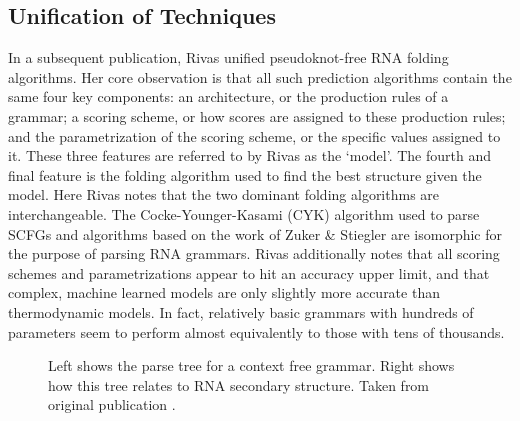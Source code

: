 \documentclass[12pt, a4paper]{article}
\begin{document}
\subsection{Unification of Techniques}

In a subsequent publication, Rivas \cite{rivas2013four} unified pseudoknot-free RNA folding algorithms. Her core observation is that all such prediction algorithms contain the same four key components: an architecture, or the production rules of a grammar; a scoring scheme, or how scores are assigned to these production rules; and the parametrization of the scoring scheme, or the specific values assigned to it. These three features are referred to by Rivas as the `model'. The fourth and final feature is the folding algorithm used to find the best structure given the model. Here Rivas notes that the two dominant folding algorithms are interchangeable. The Cocke-Younger-Kasami (CYK) algorithm used to parse SCFGs and algorithms based on the work of Zuker \& Stiegler are isomorphic for the purpose of parsing RNA grammars. Rivas additionally notes that all scoring schemes and parametrizations appear to hit an accuracy upper limit, and that complex, machine learned models are only slightly more accurate than thermodynamic models. In fact, relatively basic grammars with hundreds of parameters seem to perform almost equivalently to those with tens of thousands.

\begin{figure}
\begin{center}
\end{center}
\caption{Left shows the parse tree for a context free grammar. Right shows how this tree relates to RNA secondary structure. Taken from original publication \cite{sakakibara1994stochastic}.}
\label{fig:scfg}
\end{figure}
\end{document}
